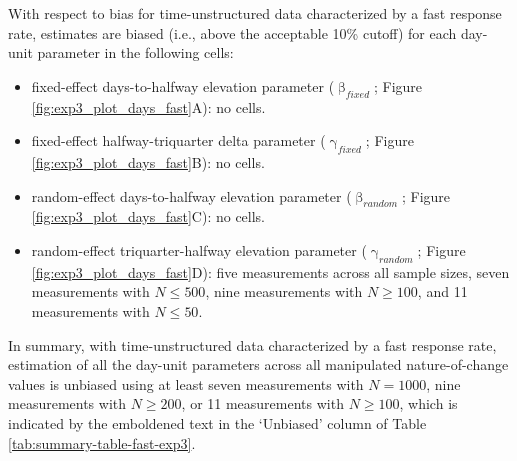 \documentclass[
12pt, %
twoside,
english]{guelphthesis}
\theoremstyle{definition}
\theoremstyle{definition}
\theoremstyle{definition}
\theoremstyle{definition}
\theoremstyle{remark}
\begin{document}
With respect to bias for time-unstructured data characterized by a fast response rate, estimates are biased (i.e., above the acceptable 10\% cutoff) for each day-unit parameter in the following cells:
\begin{itemize}
\tightlist
\item
  fixed-effect days-to-halfway elevation parameter (\(\upbeta_{fixed}\); Figure \ref{fig:exp3_plot_days_fast}A): no cells.
\item
  fixed-effect halfway-triquarter delta parameter (\(\upgamma_{fixed}\); Figure \ref{fig:exp3_plot_days_fast}B): no cells.
\item
  random-effect days-to-halfway elevation parameter (\(\upbeta_{random}\); Figure \ref{fig:exp3_plot_days_fast}C): no cells.
\item
  random-effect triquarter-halfway elevation parameter (\(\upgamma_{random}\); Figure \ref{fig:exp3_plot_days_fast}D): five measurements across all sample sizes, seven measurements with \(N \le 500\), nine measurements with \(N \ge 100\), and 11 measurements with \(N \le 50\).
\end{itemize}
In summary, with time-unstructured data characterized by a fast response rate, estimation of all the day-unit parameters across all manipulated nature-of-change values is unbiased using at least seven measurements with \(N = 1000\), nine measurements with \(N \ge 200\), or 11 measurements with \(N \ge 100\), which is indicated by the emboldened text in the `Unbiased' column of Table \ref{tab:summary-table-fast-exp3}.
\end{document}
